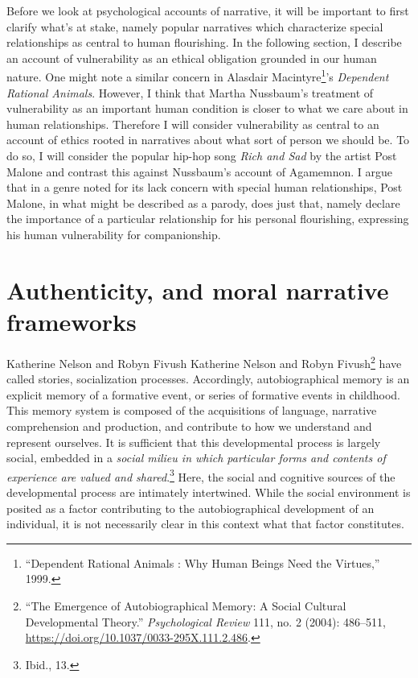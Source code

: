 \documentclass[
  12pt,
]{book}
\theoremstyle{definition}
\theoremstyle{definition}
\theoremstyle{definition}
\theoremstyle{definition}
\theoremstyle{remark}
\begin{document}
Before we look at psychological accounts of narrative, it will be important to first clarify what's at stake, namely popular narratives which characterize special relationships as central to human flourishing. In the following section, I describe an account of vulnerability as an ethical obligation grounded in our human nature. One might note a similar concern in Alasdair Macintyre\footnote{{``Dependent Rational Animals : Why Human Beings Need the Virtues,''} 1999.}'s \emph{Dependent Rational Animals}. However, I think that Martha Nussbaum's treatment of vulnerability as an important human condition is closer to what we care about in human relationships. Therefore I will consider vulnerability as central to an account of ethics rooted in narratives about what sort of person we should be. To do so, I will consider the popular hip-hop song \emph{Rich and Sad} by the artist Post Malone and contrast this against Nussbaum's account of Agamemnon. I argue that in a genre noted for its lack concern with special human relationships, Post Malone, in what might be described as a parody, does just that, namely declare the importance of a particular relationship for his personal flourishing, expressing his human vulnerability for companionship.

\section{Authenticity, and moral narrative frameworks}\label{authenticity-and-moral-narrative-frameworks}

Katherine Nelson and Robyn Fivush Katherine Nelson and Robyn Fivush\footnote{{``The {Emergence} of {Autobiographical Memory}: {A Social Cultural Developmental Theory}.''} \emph{Psychological Review} 111, no. 2 (2004): 486--511, \url{https://doi.org/10.1037/0033-295X.111.2.486}.} have called stories, socialization processes. Accordingly, autobiographical memory is an explicit memory of a formative event, or series of formative events in childhood. This memory system is composed of the acquisitions of language, narrative comprehension and production, and contribute to how we understand and represent ourselves. It is sufficient that this developmental process is largely social, embedded in a \emph{social milieu in which particular forms and contents of experience are valued and shared}.\footnote{Ibid., 13.} Here, the social and cognitive sources of the developmental process are intimately intertwined. While the social environment is posited as a factor contributing to the autobiographical development of an individual, it is not necessarily clear in this context what that factor constitutes.
\end{document}
